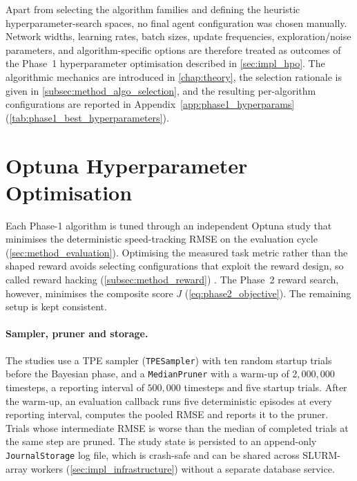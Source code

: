Apart from selecting the algorithm families and defining the heuristic hyperparameter-search spaces, no final agent configuration was chosen manually. Network widths, learning rates, batch sizes, update frequencies, exploration/noise parameters, and algorithm-specific options are therefore treated as outcomes of the Phase~1 hyperparameter optimisation described in \autoref{sec:impl_hpo}. The algorithmic mechanics are introduced in \autoref{chap:theory}, the selection rationale is given in \autoref{subsec:method_algo_selection}, and the resulting per-algorithm configurations are reported in Appendix~\ref{app:phase1_hyperparams} (\autoref{tab:phase1_best_hyperparameters}).

\section{Optuna Hyperparameter Optimisation}
\label{sec:impl_hpo}

Each Phase-1 algorithm is tuned through an independent Optuna study that minimises the deterministic speed-tracking \ac{RMSE} on the evaluation cycle (\autoref{sec:method_evaluation}). Optimising the measured task metric rather than the shaped reward avoids selecting configurations that exploit the reward design, so called reward hacking (\autoref{subsec:method_reward}) \cite{pan_effects_2022}. The Phase~2 reward search, however, minimises the composite score $J$ (\autoref{eq:phase2_objective}). The remaining setup is kept consistent.

\paragraph{Sampler, pruner and storage.}
The studies use a \ac{TPE} sampler (\texttt{TPESampler}) with ten random startup trials before the Bayesian phase, and a \texttt{MedianPruner} with a warm-up of $2{,}000{,}000$ timesteps, a reporting interval of $500{,}000$ timesteps and five startup trials. After the warm-up, an evaluation callback runs five deterministic episodes at every reporting interval, computes the pooled \ac{RMSE} and reports it to the pruner. Trials whose intermediate \ac{RMSE} is worse than the median of completed trials at the same step are pruned. The study state is persisted to an append-only \texttt{JournalStorage} log file, which is crash-safe and can be shared across SLURM-array workers (\autoref{sec:impl_infrastructure}) without a separate database service.


